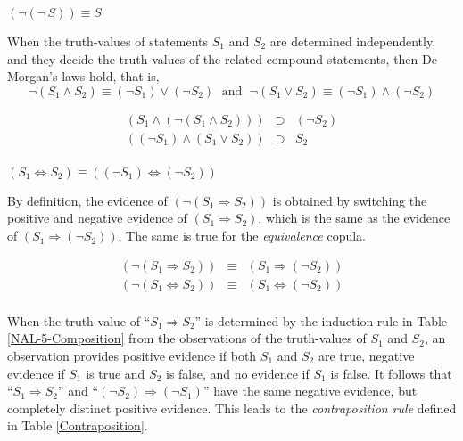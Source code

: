 \begin{theo}
\((\neg (\neg \, S)) \equiv S\)
\end{theo}

\begin{theo}
When the truth-values of statements $S_1$ and $S_2$ are determined independently, and they decide the truth-values of the related compound statements, then De Morgan's laws hold, that is,
\[\neg(S_1 \wedge S_2) \equiv (\neg S_1) \vee (\neg S_2) \;\mbox{ and }\;
\neg(S_1 \vee S_2) \equiv (\neg S_1) \wedge (\neg S_2)\]
\end{theo}

\begin{theo}
\[\begin{array}{rcl}
(S_1 \wedge (\neg (S_1 \wedge S_2))) & \supset & (\neg S_2) \\
((\neg S_1) \wedge (S_1 \vee S_2)) & \supset & S_2 \\
\end{array} \]
\end{theo}

\begin{theo}
\((S_1 \Leftrightarrow S_2) \equiv ((\neg S_1) \Leftrightarrow (\neg S_2))\)
\end{theo}

By definition, the evidence of \((\neg(S_1 \Rightarrow S_2))\) is obtained by switching the positive and negative evidence of \((S_1 \Rightarrow S_2)\), which is the same as the evidence of \((S_1 \Rightarrow (\neg S_2))\). The same is true for the \emph{equivalence} copula.

\begin{theo}
\[\begin{array}{ccc}
(\neg(S_1 \Rightarrow S_2)) & \equiv & (S_1 \Rightarrow (\neg S_2)) \\
(\neg(S_1 \Leftrightarrow S_2)) & \equiv & (S_1 \Leftrightarrow (\neg S_2)) \\
\end{array}\]
\end{theo}

When the truth-value of ``\(S_1 \Rightarrow S_2\)'' is determined by the induction rule in Table \ref{NAL-5-Composition} from the observations of the truth-values of $S_1$ and $S_2$, an observation provides positive evidence if both $S_1$ and $S_2$ are true, negative evidence if $S_1$ is true and $S_2$ is false, and no evidence if $S_1$ is false. It follows that ``\(S_1 \Rightarrow S_2\)'' and ``\((\neg S_2) \Rightarrow (\neg S_1)\)'' have the same negative evidence, but completely distinct positive evidence.  This leads to the \emph{contraposition rule} defined in Table \ref{Contraposition}.

